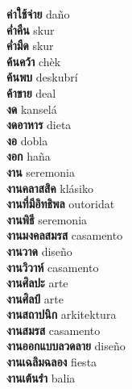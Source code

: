 \textbf{ ค่าใช้จ่าย  } daño \\
\textbf{ ค่ำคืน  } skur \\
\textbf{ ค่ำมืด  } skur \\
\textbf{ ค้นคว้า  } chèk \\
\textbf{ ค้นพบ  } deskubrí \\
\textbf{ ค้าขาย  } deal \\
\textbf{ งด  } kanselá \\
\textbf{ งดอาหาร  } dieta \\
\textbf{ งอ  } dobla \\
\textbf{ งอก  } haña \\
\textbf{ งาน  } seremonia \\
\textbf{ งานคลาสสิค  } klásiko \\
\textbf{ งานที่มีอิทธิพล  } outoridat \\
\textbf{ งานพิธี  } seremonia \\
\textbf{ งานมงคลสมรส  } casamento \\
\textbf{ งานวาด  } diseño \\
\textbf{ งานวิวาห์  } casamento \\
\textbf{ งานศิลปะ  } arte \\
\textbf{ งานศิลป์  } arte \\
\textbf{ งานสถาปนิก  } arkitektura \\
\textbf{ งานสมรส  } casamento \\
\textbf{ งานออกแบบลวดลาย  } diseño \\
\textbf{ งานเฉลิมฉลอง  } fiesta \\
\textbf{ งานเต้นรำ  } balia \\
